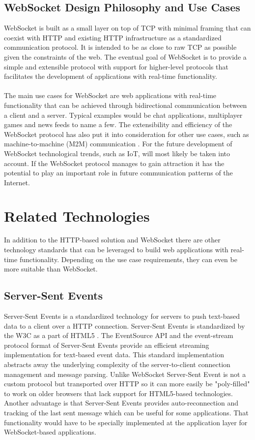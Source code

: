 \subsection{WebSocket Design Philosophy and Use Cases}

WebSocket is built as a small layer on top of TCP with minimal framing that can coexist with HTTP and existing HTTP infrastructure as a standardized communication protocol. It is intended to be as close to raw TCP as possible given the constraints of the web. The eventual goal of WebSocket is to provide a simple and extensible protocol with support for higher-level protocols that facilitates the development of applications with real-time functionality.
\\ \\
The main use cases for WebSocket are web applications with real-time functionality that can be achieved through bidirectional communication between a client and a server. Typical examples would be chat applications, multiplayer games and news feeds to name a few. The extensibility and efficiency of the WebSocket protocol has also put it into consideration for other use cases, such as machine-to-machine (M2M) communication \cite{perez2013electric,doukas2015providing}. For the future development of WebSocket technological trends, such as IoT, will most likely be taken into account. If the WebSocket protocol manages to gain attraction it has the potential to play an important role in future communication patterns of the Internet.

\section{Related Technologies}

In addition to the HTTP-based solution and WebSocket there are other technology standards that can be leveraged to build web applications with real-time functionality. Depending on the use case requirements, they can even be more suitable than WebSocket.

\subsection{Server-Sent Events}

Server-Sent Events is a standardized technology for servers to push text-based data to a client over a HTTP connection. Server-Sent Events is standardized by the W3C as a part of HTML5 \cite{hickson2009server}. The EventSource API and the event-stream protocol format of Server-Sent Events provide an efficient streaming implementation for text-based event data. This standard implementation abstracts away the underlying complexity of the server-to-client connection management and message parsing. Unlike WebSocket Server-Sent Event is not a custom protocol but transported over HTTP so it can more easily be "poly-filled" to work on older browsers that lack support for HTML5-based technologies. Another advantage is that Server-Sent Events provides auto-reconnection and tracking of the last sent message which can be useful for some applications. That functionality would have to be specially implemented at the application layer for WebSocket-based applications.

